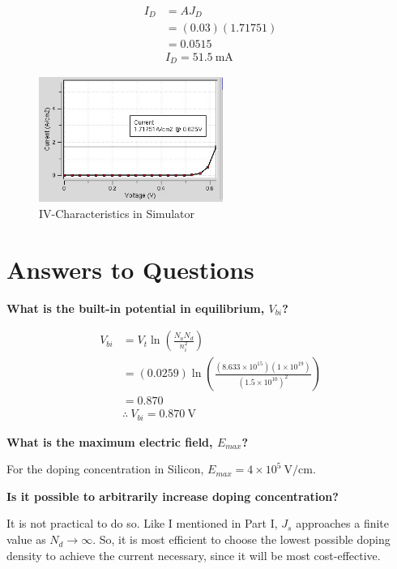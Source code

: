 \documentclass{IEEEtran}
\begin{document}
\begin{align*}
    I_D &= AJ_D \\
        &= (0.03)(1.71751) \\
        &= 0.0515 \\
        & \boxed{I_D = 51.5 ~ \text{mA}}
\end{align*}

\begin{figure}[!ht] 
    \centering
    \includegraphics[width = 6cm]{current.jpg}
    \caption{IV-Characteristics in Simulator}
    \label{fig:current}
\end{figure}

\section*{Answers to Questions}

\textbf{What is the built-in potential in equilibrium, \(V_{bi}\)?}

\begin{align*}
    V_{bi} &= V_t \ln \left( \frac{N_a N_d}{n_i^2}  \right) \\
           &= (0.0259)\ln \left( \frac{(8.633\times10^{15})(1\times10^{19})}{(1.5\times10^{10})^2}  \right) \\ 
           &= 0.870 \\
           & \therefore ~ \boxed{V_{bi} = 0.870~\text{V}}
\end{align*}

\textbf{What is the maximum electric field, \(E_{max}\)?}

For the doping concentration in Silicon, \(E_{max} = 4\times10^5 ~ \text{V}/\text{cm}\).

\textbf{Is it possible to arbitrarily increase doping concentration?}

It is not practical to do so. Like I mentioned in Part I, \(J_s\) approaches a finite value as \(N_d \to \infty\). So, it is most efficient to choose the lowest possible doping density to achieve the current necessary, since it will be most cost-effective.
\end{document}
